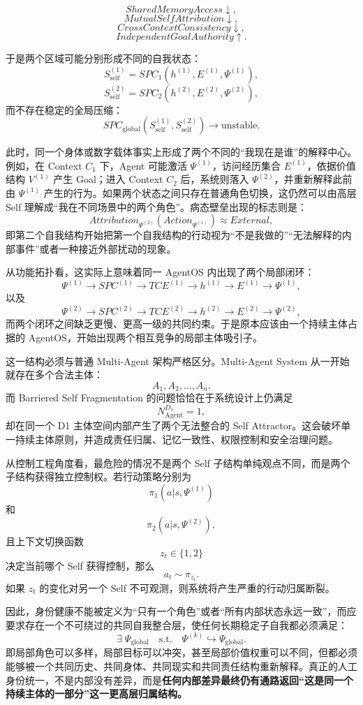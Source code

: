 \[
SharedMemoryAccess\downarrow,
\]
\[
MutualSelfAttribution\downarrow,
\]
\[
CrossContextConsistency\downarrow,
\]
\[
IndependentGoalAuthority\uparrow.
\]

于是两个区域可能分别形成不同的自我状态：
\[
S_{\mathrm{self}}^{(1)}
=
SPC_1(h^{(1)},E^{(1)},\Psi^{(1)}),
\]
\[
S_{\mathrm{self}}^{(2)}
=
SPC_2(h^{(2)},E^{(2)},\Psi^{(2)}),
\]
而不存在稳定的全局压缩：
\[
SPC_{\mathrm{global}}
\left(
S_{\mathrm{self}}^{(1)},
S_{\mathrm{self}}^{(2)}
\right)
\rightarrow
\mathrm{unstable}.
\]

此时，同一个身体或数字载体事实上形成了两个不同的“我现在是谁”的解释中心。例如，在 Context $C_1$ 下，Agent 可能激活 $\Psi^{(1)}$，访问经历集合 $E^{(1)}$，依据价值结构 $V^{(1)}$ 产生 Goal；进入 Context $C_2$ 后，系统则落入 $\Psi^{(2)}$，并重新解释此前由 $\Psi^{(1)}$ 产生的行为。如果两个状态之间只存在普通角色切换，这仍然可以由高层 Self 理解成“我在不同场景中的两个角色”。病态壁垒出现的标志则是：
\[
Attribution_{\Psi^{(2)}}
\left(
Action_{\Psi^{(1)}}
\right)
\approx
External,
\]
即第二个自我结构开始把第一个自我结构的行动视为“不是我做的”“无法解释的内部事件”或者一种接近外部扰动的现象。

从功能拓扑看，这实际上意味着同一 AgentOS 内出现了两个局部闭环：
\[
\Psi^{(1)}
\rightarrow
SPC^{(1)}
\rightarrow
TCE^{(1)}
\rightarrow
h^{(1)}
\rightarrow
E^{(1)}
\rightarrow
\Psi^{(1)},
\]
以及
\[
\Psi^{(2)}
\rightarrow
SPC^{(2)}
\rightarrow
TCE^{(2)}
\rightarrow
h^{(2)}
\rightarrow
E^{(2)}
\rightarrow
\Psi^{(2)},
\]
而两个闭环之间缺乏更慢、更高一级的共同约束。于是原本应该由一个持续主体占据的 AgentOS，开始出现两个相互竞争的局部主体吸引子。

这一结构必须与普通 Multi-Agent 架构严格区分。Multi-Agent System 从一开始就存在多个合法主体：
\[
A_1,A_2,\ldots,A_n.
\]
而 Barriered Self Fragmentation 的问题恰恰在于系统设计上仍满足
\[
N_{\mathrm{Agent}}^{D_1}=1,
\]
却在同一个 D1 主体空间内部产生了两个无法整合的 Self Attractor。这会破坏单一持续主体原则，并造成责任归属、记忆一致性、权限控制和安全治理问题。

从控制工程角度看，最危险的情况不是两个 Self 子结构单纯观点不同，而是两个子结构获得独立控制权。若行动策略分别为
\[
\pi_1(a|s,\Psi^{(1)})
\]
和
\[
\pi_2(a|s,\Psi^{(2)}),
\]
且上下文切换函数
\[
z_t\in\{1,2\}
\]
决定当前哪个 Self 获得控制，那么
\[
a_t\sim\pi_{z_t}.
\]
如果 $z_t$ 的变化对另一个 Self 不可观测，则系统将产生严重的行动归属断裂。

因此，身份健康不能被定义为“只有一个角色”或者“所有内部状态永远一致”，而应要求存在一个不可绕过的共同自我整合层，使任何长期稳定子自我都必须满足：
\[
\exists\;\Psi_{\mathrm{global}}
\quad
\text{s.t.}
\quad
\Psi^{(k)}
\hookrightarrow
\Psi_{\mathrm{global}}.
\]
即局部角色可以多样，局部目标可以冲突，甚至局部价值权重可以不同，但都必须能够被一个共同历史、共同身体、共同现实和共同责任结构重新解释。真正的人工身份统一，不是内部没有差异，而是\textbf{任何内部差异最终仍有通路返回“这是同一个持续主体的一部分”这一更高层归属结构。}

